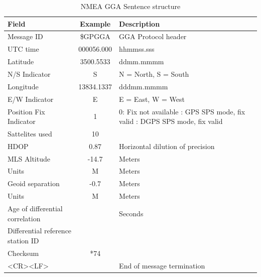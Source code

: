 \renewcommand{\arraystretch}{1.5}
\begin{table}[!h]
    \begin{center}
        \caption{NMEA GGA Sentence structure}
        \label{tab:NMEA GGA Struct}
        \begin{tabular}{ |m{4cm}|c|p{6cm}| }
            \hline
            \textbf{Field} & \textbf{Example} & \textbf{Description} \\
            \hline
            Message ID & \$GPGGA & GGA Protocol header \\
            \hline
            UTC time & 000056.000 & hhmmss.sss \\
            \hline
            Latitude & 3500.5533 & ddmm.mmmm \\
            \hline
            N/S Indicator & S & N = North, S = South\\
            \hline
            Longitude & 13834.1337 & dddmm.mmmm \\
            \hline
            E/W Indicator & E & E = East, W = West\\
            \hline
            Position Fix Indicator & 1 & 0: Fix not available \newline 1: GPS SPS mode, fix valid \newline 2: DGPS SPS mode, fix valid\\
            \hline
            Sattelites used & 10 & \\
            \hline
            HDOP & 0.87 & Horizontal dilution of precision\\
            \hline
            MLS Altitude & -14.7 & Meters \\
            \hline
            Units & M & Meters \\
            \hline
            Geoid separation & -0.7 & Meters \\
            \hline
            Units & M & Meters\\
            \hline
            Age of differential correlation & & Seconds\\
            \hline
            Differential reference station ID & &  \\
            \hline
            Checksum & *74 &  \\
            \hline
            <CR><LF> & & End of message termination \\
            \hline
        \end{tabular}
    \end{center}
\end{table}
\renewcommand{\arraystretch}{1}

